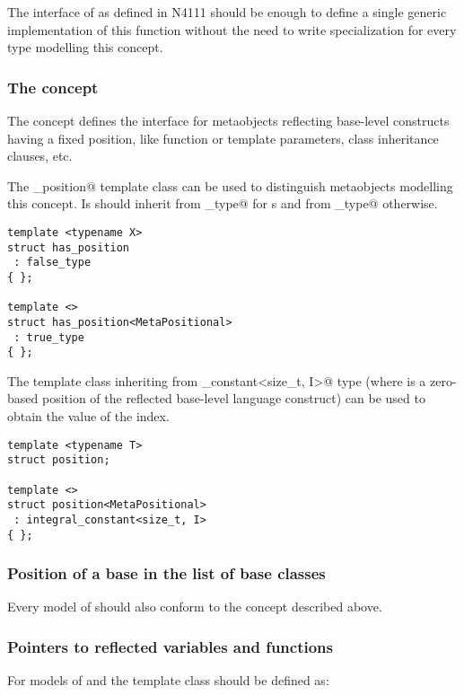 The interface of  as defined in N4111 should be enough
to define a single generic implementation of this function without the need
to write specialization for every type modelling this concept.

\subsubsection{The  concept}

The  concept defines the interface for metaobjects reflecting
base-level constructs having a fixed position, like function or template parameters,
class inheritance clauses, etc.

The \verb@has_position@ template class can be used to distinguish metaobjects modelling
this concept. Is should inherit from \verb@true_type@ for s and from
\verb@false_type@ otherwise.

\begin{verbatim}
template <typename X>
struct has_position
 : false_type
{ };

template <>
struct has_position<MetaPositional>
 : true_type
{ };
\end{verbatim}

The \verb@position@ template class inheriting
from \verb@integral_constant<size_t, I>@ type (where \verb@I@ is
a zero-based position of the reflected base-level language construct)
can be used to obtain the value of the index.

\begin{verbatim}
template <typename T>
struct position;

template <>
struct position<MetaPositional>
 : integral_constant<size_t, I>
{ };
\end{verbatim}

\subsubsection{Position of a base in the list of base classes}

Every model of  should also conform to the 
concept described above.

\subsubsection{Pointers to reflected variables and functions}

For models of  and  the \verb@pointer@ template class
should be defined as:

